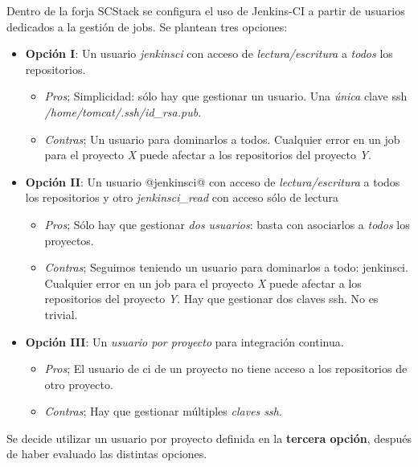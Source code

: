 \par Dentro de la forja SCStack se configura el uso de Jenkins-CI a partir de usuarios dedicados a la gestión de jobs. Se plantean tres opciones:

\begin{itemize}
	\item \textbf{Opción I}: Un usuario \emph{jenkinsci} con acceso de \emph{lectura/escritura} a \emph{todos} los repositorios.
        \begin{itemize}

        	\item \emph{Pros}; Simplicidad: sólo hay que gestionar un usuario. Una \emph{única} clave ssh \emph{/home/tomcat/.ssh/id\_rsa.pub}.
        	\item \emph{Contras}; Un usuario para dominarlos a todos. Cualquier error en un job para el proyecto \emph{X} puede afectar a los repositorios del proyecto \emph{Y}.
        \end{itemize}

	\item \textbf{Opción II}: Un usuario @jenkinsci@ con acceso de \emph{lectura/escritura} a todos los repositorios y  otro \emph{jenkinsci\_read} con acceso sólo de lectura	
        \begin{itemize}
        	\item \emph{Pros}; Sólo hay que gestionar \emph{dos usuarios}: basta con asociarlos a \emph{todos} los proyectos.
        	\item \emph{Contras}; Seguimos teniendo un usuario para dominarlos a todo: jenkinsci. Cualquier error en un job para el proyecto \emph{X} puede afectar a los repositorios del proyecto \emph{Y}. Hay que gestionar dos claves ssh. No es trivial.
        \end{itemize}

	\item \textbf{Opción III}: Un \emph{usuario por proyecto} para integración continua.
        \begin{itemize}
        	\item \emph{Pros}; El usuario de ci de un proyecto no tiene acceso a los repositorios de otro proyecto.
        	\item \emph{Contras}; Hay que gestionar múltiples \emph{claves ssh}.
        \end{itemize}

\end{itemize}

\par Se decide utilizar un usuario por proyecto definida en la \textbf{tercera opción}, después de haber evaluado las distintas opciones.
 
